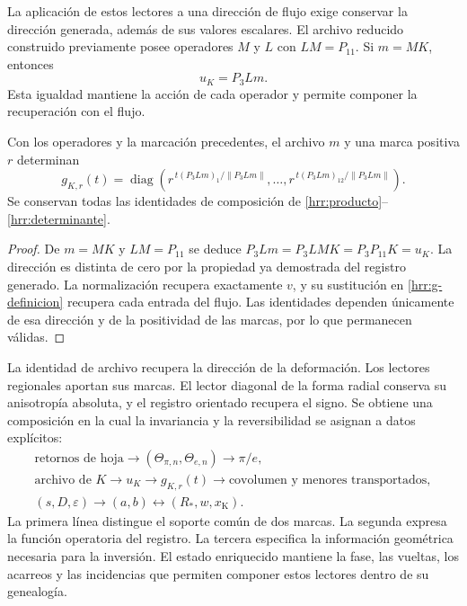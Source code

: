La aplicación de estos lectores a una dirección de flujo exige conservar
la dirección generada, además de sus valores escalares. El archivo
reducido construido previamente posee operadores \(M\) y \(L\)
con \(LM=P_{11}\). Si \(m=MK\), entonces
\begin{equation}
 u_K=P_3Lm.
 \label{hrr:archivo-direccion}
\end{equation}
Esta igualdad mantiene la acción de cada operador y permite componer
la recuperación con el flujo.

\begin{proposition}
\label{hrr:archivo-flujo}
Con los operadores y la marcación precedentes, el archivo \(m\) y
una marca positiva \(r\) determinan
\[
 g_{K,r}(t)=
 \operatorname{diag}\left(
 r^{\,t(P_3Lm)_1/\|P_3Lm\|},\ldots,
 r^{\,t(P_3Lm)_{12}/\|P_3Lm\|}\right).
\]
Se conservan todas las identidades de composición de
\eqref{hrr:producto}--\eqref{hrr:determinante}.
\end{proposition}
\begin{proof}
De \(m=MK\) y \(LM=P_{11}\) se deduce
\(P_3Lm=P_3LMK=P_3P_{11}K=u_K\).
La dirección es distinta de cero por la propiedad ya demostrada del
registro generado. La normalización recupera exactamente \(v\),
y su sustitución en \eqref{hrr:g-definicion} recupera cada entrada
del flujo. Las identidades dependen únicamente de esa dirección y
de la positividad de las marcas, por lo que permanecen válidas.
\end{proof}

La identidad de archivo recupera la dirección de la deformación.
Los lectores regionales aportan sus marcas. El lector diagonal de
la forma radial conserva su anisotropía absoluta, y el registro
orientado recupera el signo. Se obtiene una composición en la cual
la invariancia y la reversibilidad se asignan a datos explícitos:
\[
 \begin{gathered}
 \text{retornos de hoja}
 \longrightarrow(\Theta_{\pi,n},\Theta_{e,n})
 \longrightarrow\pi/e,\\
 \text{archivo de }K\longrightarrow u_K
 \longrightarrow g_{K,r}(t)
 \longrightarrow\text{covolumen y menores transportados},\\
 (s,D,\varepsilon)\longrightarrow(a,b)
 \longleftrightarrow(R_*,w,x_{\mathrm K}).
 \end{gathered}
\]
La primera línea distingue el soporte común de dos marcas. La segunda
expresa la función operatoria del registro. La tercera especifica la
información geométrica necesaria para la inversión. El estado enriquecido
mantiene la fase, las vueltas, los acarreos y las incidencias que permiten
componer estos lectores dentro de su genealogía.

